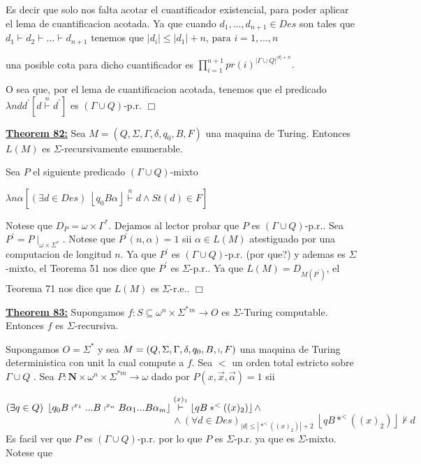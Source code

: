   Es decir que solo nos falta acotar el cuantificador existencial, para poder aplicar el lema de cuantificacion acotada. Ya que cuando $ d_{1},...,d_{n+1}\in Des$ son tales que $d_{1}\vdash d_{2}\vdash ...\vdash d_{n+1}$ tenemos que
  $\displaystyle \left\vert d_{i}\right\vert \leq \left\vert d_{1}\right\vert +n\text{, para } i=1,...,n $

  una posible cota para dicho cuantificador es
  $\displaystyle \prod_{i=1}^{n+1}pr(i)^{\left\vert \Gamma \cup Q\right\vert ^{\left\vert d\right\vert +n}}\text{.} $

  O sea que, por el lema de cuantificacion acotada, tenemos que el predicado $ \lambda ndd^{\prime }\left[ d\overset{n}{\vdash }d^{\prime }\right] $ es $ (\Gamma \cup Q)$-p.r. $\Box$

  \textbf{\underline{Theorem 82:}} Sea $M=\left( Q,\Sigma ,\Gamma ,\delta ,q_{0},B,F\right) $ una maquina de Turing. Entonces $L(M)$ es $\Sigma $-recursivamente enumerable.


  \PROOF Sea $P$ el siguiente predicado $(\Gamma \cup Q)$-mixto

  $\displaystyle \lambda n\alpha \left[ (\exists d\in Des)\;\left\lfloor q_{0}B\alpha \right\rfloor \overset{n}{\vdash }d\wedge St(d)\in F\right] $

  Notese que $D_{P}=\omega \times \Gamma ^{\ast }$. Dejamos al lector probar que $P$ es $(\Gamma \cup Q)$-p.r.. Sea $P^{\prime }=P\mid _{\omega \times \Sigma ^{\ast }}$. Notese que $P^{\prime }(n,\alpha )=1$ sii $\alpha \in L(M) $ atestiguado por una computacion de longitud $n$. Ya que $P^{\prime }$ es $(\Gamma \cup Q)$-p.r. (por que?) y ademas es $\Sigma $-mixto, el Teorema 51 nos dice que $P^{\prime }$ es $\Sigma $-p.r.. Ya que $ L(M)=D_{M(P^{\prime })}$, el Teorema 71 nos dice que $ L(M)$ es $\Sigma $-r.e.. $\Box$

  \textbf{\underline{Theorem 83:}} Supongamos $f:S\subseteq \omega ^{n}\times \Sigma ^{\ast }{}^{m}\rightarrow O $ es $\Sigma $-Turing computable. Entonces $f$ es $\Sigma $-recursiva.

  \PROOF Supongamos $O=\Sigma ^{\ast }$ y sea $M=\left( Q,\Sigma ,\Gamma ,\delta ,q_{0},B,\shortmid ,F\right) $ una maquina de Turing deterministica con unit la cual compute a $f$. Sea $< $ un orden total estricto sobre $\Gamma \cup Q$ . Sea $P:\mathbf{N}\times \omega ^{n}\times \Sigma ^{\ast m}\rightarrow \omega $ dado por $P(x,\vec{x},\vec{\alpha})=1$ sii

  $(\exists q\in Q)\;\left\lfloor q_{0}B\shortmid ^{x_{1}}...B\shortmid ^{x_{n}}B\alpha _{1}...B\alpha _{m}\right\rfloor \overset{(x)_{1}}{\vdash } \left\lfloor qB\ast ^{< }((x)_{2})\right\rfloor \wedge $
  $\ \ \ \ \ \ \ \ \ \ \ \ \ \ \ \ \ \ \ \ \ \ \ \ \ \ \ \ \ \ \ \ \ \ \ \ \ \ \ \ \ \ \ \ \ \ \ \ \ \ \ \ \ \ \ \ \ \ \ \ \ \ \ \ \ \ \ \ \ \ \ \ \ \ \ \ \ \wedge (\forall d\in Des)_{\left\vert d\right\vert \leq \left\vert \ast ^{< }((x)_{2})\right\vert +2}\;\left\lfloor qB\ast ^{< }((x)_{2})\right\rfloor \nvdash d$
  Es facil ver que $P$ es $(\Gamma \cup Q)$-p.r. por lo que $P$ es $ \Sigma $-p.r. ya que es $\Sigma $-mixto. Notese que

